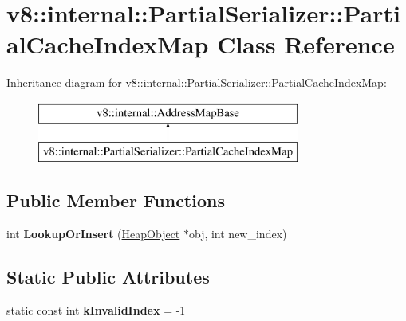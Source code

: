 \hypertarget{classv8_1_1internal_1_1_partial_serializer_1_1_partial_cache_index_map}{}\section{v8\+:\+:internal\+:\+:Partial\+Serializer\+:\+:Partial\+Cache\+Index\+Map Class Reference}
\label{classv8_1_1internal_1_1_partial_serializer_1_1_partial_cache_index_map}
Inheritance diagram for v8\+:\+:internal\+:\+:Partial\+Serializer\+:\+:Partial\+Cache\+Index\+Map\+:\begin{figure}[H]
\begin{center}
\leavevmode
\includegraphics[height=2.000000cm]{classv8_1_1internal_1_1_partial_serializer_1_1_partial_cache_index_map}
\end{center}
\end{figure}
\subsection*{Public Member Functions}
\begin{DoxyCompactItemize}
\item 
int {\bfseries Lookup\+Or\+Insert} (\hyperlink{classv8_1_1internal_1_1_heap_object}{Heap\+Object} $\ast$obj, int new\+\_\+index)\hypertarget{classv8_1_1internal_1_1_partial_serializer_1_1_partial_cache_index_map_ae3d84c417b4ac516977afc7de8a59532}{}\label{classv8_1_1internal_1_1_partial_serializer_1_1_partial_cache_index_map_ae3d84c417b4ac516977afc7de8a59532}

\end{DoxyCompactItemize}
\subsection*{Static Public Attributes}
\begin{DoxyCompactItemize}
\item 
static const int {\bfseries k\+Invalid\+Index} = -\/1\hypertarget{classv8_1_1internal_1_1_partial_serializer_1_1_partial_cache_index_map_a34d6514847aa499b72cf1e5ec7a4e6d4}{}\label{classv8_1_1internal_1_1_partial_serializer_1_1_partial_cache_index_map_a34d6514847aa499b72cf1e5ec7a4e6d4}

\end{DoxyCompactItemize}
